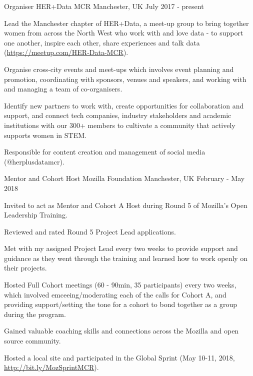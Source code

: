 \begin{cventries}
\cventry
    {Organiser}
    {HER+Data MCR}
    {Manchester, UK}
    {July 2017 - present}
    {
      \begin{cvitems}
        \item {Lead the Manchester chapter of HER+Data, a meet-up group to bring together women from across the North West who work with and love data - to support one another, inspire each other, share experiences and talk data (\url{https://meetup.com/HER-Data-MCR}).}
        \item {Organise cross-city events and meet-ups which involves event planning and promotion, coordinating with sponsors, venues and speakers, and working with and managing a team of co-organisers.}
        \item {Identify new partners to work with, create opportunities for collaboration and support, and connect tech companies, industry stakeholders and academic institutions with our 300+ members to cultivate a community that actively supports women in STEM.}
        \item {Responsible for content creation and management of social media (@herplusdatamcr).}
      \end{cvitems}
    }
\cventry
    {Mentor and Cohort Host}
    {Mozilla Foundation}
    {Manchester, UK}
    {February - May 2018}
    {
      \begin{cvitems}
        \item{Invited to act as Mentor and Cohort A Host during Round 5 of Mozilla's Open Leadership Training.}
        \item{Reviewed and rated Round 5 Project Lead applications.}
        \item{Met with my assigned Project Lead every two weeks to provide support and guidance as they went through the training and learned how to work openly on their projects.}
        \item{Hosted Full Cohort meetings (60 - 90min, 35 participants) every two weeks, which involved emceeing/moderating each of the calls for Cohort A, and providing support/setting the tone for a cohort to bond together as a group during the program.}
        \item{Gained valuable coaching skills and connections across the Mozilla and open source community.}
        \item{Hosted a local site and participated in the Global Sprint (May 10-11, 2018, \url{http://bit.ly/MozSprintMCR}).}
      \end{cvitems}
}
\end{cventries}
